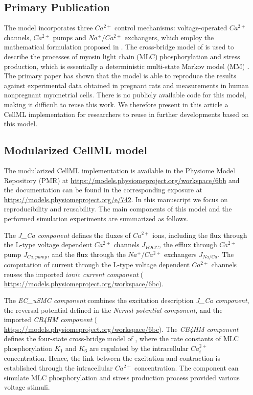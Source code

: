 \documentclass[fleqn,10pt]{physiome}
\begin{document}
\subsection{Primary Publication}
The model \citep{bursztyn2007mathematical} incorporates three $Ca^{2+}$ control mechanisms: voltage-operated $Ca^{2+}$ channels, $Ca^{2+}$ pumps and $Na^{+}$/$Ca^{2+}$ exchangers, which employ the mathematical formulation proposed in \cite{parthimos1999minimal}. The cross-bridge model of \citet{hai1988cross} is used to describe the processes of myosin light chain (MLC) phosphorylation and stress production, which is essentially a deterministic multi-state Markov model (MM) \citep{19961078}. The primary paper \citep{bursztyn2007mathematical} has shown that the model is able to reproduce the results against experimental data obtained in pregnant rats and measurements in human nonpregnant myometrial cells. There is no publicly available code for this model, making it difficult to reuse this work. We therefore present in this article a CellML implementation for researchers to reuse in further developments based on this model.

\subsection{Modularized CellML model}
The modularized CellML implementation is available in the Physiome Model Repository (PMR) at \url{https://models.physiomeproject.org/workspace/6bb} and the documentation can be found in the corresponding exposure at \url{https://models.physiomeproject.org/e/742}. In this manuscript we focus on reproducibility and reusability. The main components of this model and the performed simulation experiments are summarized as follows.

The \emph{J\_Ca component} defines the fluxes of $Ca^{2+}$ ions, including the flux through the L-type voltage dependent $Ca^{2+}$ channels $J_{VOCC}$, the efflux through $Ca^{2+}$ pump $J_{Ca,pump}$, and the flux through the $Na^{+}/Ca^{2+}$ exchangers $J_{Na/Ca}$. The computation of current through the L-type voltage dependent $Ca^{2+}$ channels reuses the imported \emph{ionic current component} ( \url{https://models.physiomeproject.org/workspace/6bc}). 

The \emph{EC\_uSMC component} combines the excitation description \emph{J\_Ca component}, the reversal potential defined in the \emph{Nernst potential component}, and the imported \emph{CB4HM component} ( \url{https://models.physiomeproject.org/workspace/6bc}). The \emph{CB4HM component} defines the four-state cross-bridge model of \citet{hai1988cross}, where the rate constants of MLC phosphorylation $K_1$ and $K_6$ are regulated by the intracellular $Ca_{i}^{2+}$  concentration. Hence, the link between the excitation and contraction is established through the intracellular $Ca^{2+}$ concentration. The component can simulate MLC phosphorylation and stress production process provided various voltage stimuli. 
\end{document}
